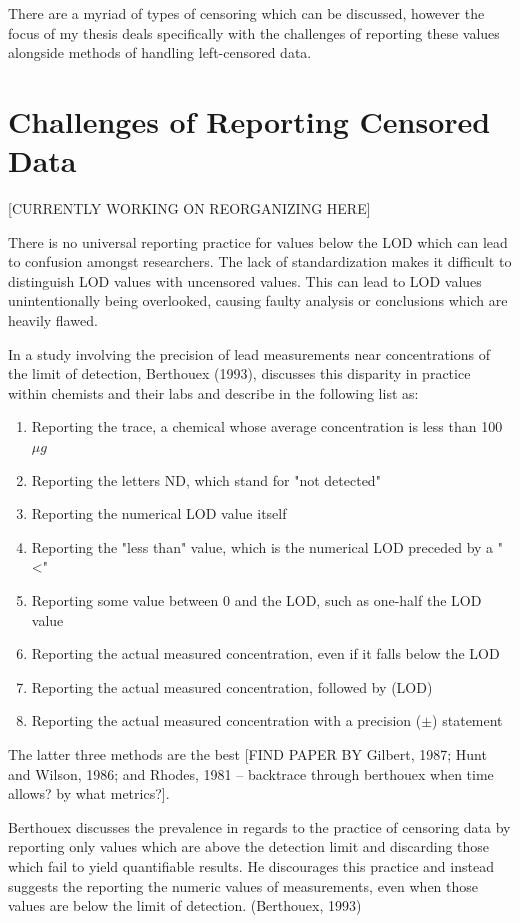 \documentclass[12pt, twoside]{amherstthesis}
\begin{document}
There are a myriad of types of censoring which can be discussed, however the focus of my thesis deals specifically with the challenges of reporting these values alongside methods of handling left-censored data.

\hypertarget{challenges}{%
\section{Challenges of Reporting Censored Data}\label{challenges}}

{[}CURRENTLY WORKING ON REORGANIZING HERE{]}

There is no universal reporting practice for values below the LOD which can lead to confusion amongst researchers. The lack of standardization makes it difficult to distinguish LOD values with uncensored values. This can lead to LOD values unintentionally being overlooked, causing faulty analysis or conclusions which are heavily flawed.

In a study involving the precision of lead measurements near concentrations of the limit of detection, Berthouex (1993), discusses this disparity in practice within chemists and their labs and describe in the following list as:
\begin{enumerate}
  \item Reporting the trace, a chemical whose average concentration is less than 100 $\mu g$
  \item Reporting  the letters ND, which stand for "not detected"
  \item Reporting the numerical LOD value itself
  \item Reporting the "less than" value, which is the numerical LOD preceded by a "<"
  \item Reporting some value between 0 and the LOD, such as one-half the LOD value
  \item Reporting the actual measured concentration, even if it falls below the LOD
  \item Reporting the actual measured concentration, followed by (LOD)
  \item Reporting the actual measured concentration with a precision ($\pm$) statement
\end{enumerate}
The latter three methods are the best {[}FIND PAPER BY Gilbert, 1987; Hunt and Wilson, 1986; and Rhodes, 1981 -- backtrace through berthouex when time allows? by what metrics?{]}.

Berthouex discusses the prevalence in regards to the practice of censoring data by reporting only values which are above the detection limit and discarding those which fail to yield quantifiable results. He discourages this practice and instead suggests the reporting the numeric values of measurements, even when those values are below the limit of detection. (Berthouex, 1993)
\end{document}
